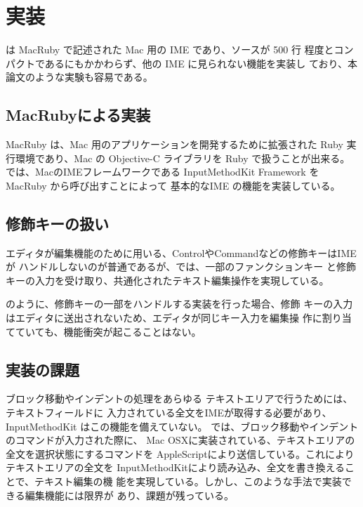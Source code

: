 \section{実装}

{\system} は MacRuby で記述された Mac 用の IME であり、ソースが 500 行
程度とコンパクトであるにもかかわらず、他の IME に見られない機能を実装し
ており、本論文のような実験も容易である。

\subsection{MacRubyによる実装}

MacRuby は、Mac 用のアプリケーションを開発するために拡張された Ruby 実
行環境であり、Mac の Objective-C ライブラリを Ruby で扱うことが出来る。
%
{\system} では、MacのIMEフレームワークである
InputMethodKit Framework を MacRuby から呼び出すことによって
基本的なIME の機能を実装している。

\subsection{修飾キーの扱い}

エディタが編集機能のために用いる、ControlやCommandなどの修飾キーはIMEが
ハンドルしないのが普通であるが、{\system}では、一部のファンクションキー
と修飾キーの入力を受け取り、共通化されたテキスト編集操作を実現している。

{\system} のように、修飾キーの一部をハンドルする実装を行った場合、修飾
キーの入力はエディタに送出されないため、エディタが同じキー入力を編集操
作に割り当てていても、機能衝突が起こることはない。

\subsection{実装の課題}

ブロック移動やインデントの処理をあらゆる テキストエリアで行うためには、
テキストフィールドに 入力されている全文をIMEが取得する必要があり、
InputMethodKit はこの機能を備えていない。
%
{\system} では、ブロック移動やインデントのコマンドが入力された際に、
Mac OSXに実装されている、テキストエリアの全文を選択状態にするコマンドを
AppleScriptにより送信している。これによりテキストエリアの全文を
InputMethodKitにより読み込み、全文を書き換えることで、テキスト編集の機
能を実現している。しかし、このような手法で実装できる編集機能には限界が
あり、課題が残っている。
